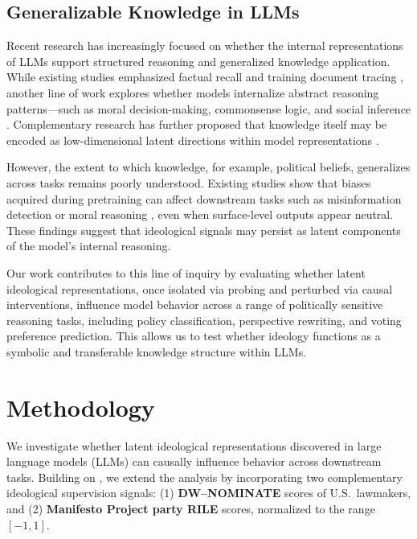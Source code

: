 \documentclass[11pt]{article}
\begin{document}
\subsection{Generalizable Knowledge in LLMs}

Recent research has increasingly focused on whether the internal representations of LLMs support structured reasoning and generalized knowledge application. While existing studies emphasized factual recall and training document tracing \citep{petroniLanguageModelsKnowledge2019, liuOLMoTraceTracingLanguage2025}, another line of work explores whether models internalize abstract reasoning patterns—such as moral decision-making, commonsense logic, and social inference \citep{ganguliCapacityMoralSelfCorrection2023, sapSocialBiasFrames2020}. Complementary research has further proposed that knowledge itself may be encoded as low-dimensional latent directions within model representations \citep{ju-etal-2024-large}.

However, the extent to which knowledge, for example, political beliefs, generalizes across tasks remains poorly understood. Existing studies show that biases acquired during pretraining can affect downstream tasks such as misinformation detection or moral reasoning \citep{fengPretrainingDataLanguage2023, guptaBiasRunsDeep2023}, even when surface-level outputs appear neutral. These findings suggest that ideological signals may persist as latent components of the model’s internal reasoning.

Our work contributes to this line of inquiry by evaluating whether latent ideological representations, once isolated via probing and perturbed via causal interventions, influence model behavior across a range of politically sensitive reasoning tasks, including policy classification, perspective rewriting, and voting preference prediction. This allows us to test whether ideology functions as a symbolic and transferable knowledge structure within LLMs.

\section{Methodology}

We investigate whether latent ideological representations discovered in large language models (LLMs) can causally influence behavior across downstream tasks. Building on \citet{kimLinearRepresentationsPolitical2025}, we extend the analysis by incorporating two complementary ideological supervision signals: (1) \textbf{DW--NOMINATE} scores of U.S.\ lawmakers, and (2) \textbf{Manifesto Project party RILE} scores, normalized to the range $[-1, 1]$. 
\end{document}
